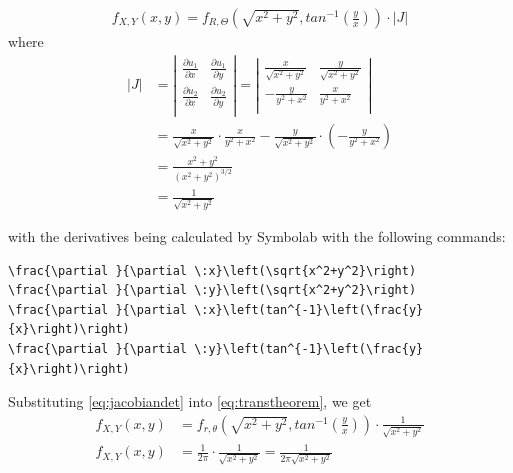 \begin{equation}
\begin{split}
f_{X,Y}(x,y) = f_{R,\Theta}\left(\sqrt{x^2+y^2},tan^{-1}\left(\frac{y}{x}\right)\right) \cdot |J|
\end{split}
\label{eq:transtheorem}
\end{equation}
where 
\begin{equation}
\begin{split}
|J| &=
\left|
\begin{matrix}
\frac{\partial u_1}{\partial x} & 
\frac{\partial u_1}{\partial y}  \\[2ex] %
\frac{\partial u_2}{\partial x} & 
\frac{\partial u_2}{\partial y}  \\[2ex]
\end{matrix}
\right|
= 
\left|
\begin{matrix}
\frac{x}{\sqrt{x^2+y^2}}& 
\frac{y}{\sqrt{x^2+y^2}}  \\[2ex] %
-\frac{y}{y^2+x^2} & 
\frac{x}{y^2+x^2}  \\[2ex]
\end{matrix}
\right|\\[2ex]
&= \frac{x}{\sqrt{x^2+y^2}} \cdot \frac{x}{y^2+x^2} -\frac{y}{\sqrt{x^2+y^2}}  \cdot \left(-\frac{y}{y^2+x^2}\right)\\[2ex]
&= \frac{x^2+y^2}{(x^2+y^2)^{3/2}}\\[2ex]
&=\frac{1}{\sqrt{x^2+y^2}}
\end{split}
\label{eq:jacobiandet}
\end{equation}

with the derivatives being calculated by Symbolab \cite{symbolab} with the following commands:
\begin{lstlisting}
\frac{\partial }{\partial \:x}\left(\sqrt{x^2+y^2}\right)
\frac{\partial }{\partial \:y}\left(\sqrt{x^2+y^2}\right)
\frac{\partial }{\partial \:x}\left(tan^{-1}\left(\frac{y}{x}\right)\right)
\frac{\partial }{\partial \:y}\left(tan^{-1}\left(\frac{y}{x}\right)\right)
\end{lstlisting}

Substituting \eqref{eq:jacobiandet} into \eqref{eq:transtheorem}, we get
\begin{equation}
\begin{split}
f_{X,Y}(x,y) &= f_{r,\theta}\left(\sqrt{x^2+y^2},tan^{-1}\left(\frac{y}{x}\right)\right) \cdot \frac{1}{\sqrt{x^2+y^2}}\\[2ex]
f_{X,Y}(x,y) &= \frac{1}{2\pi} \cdot \frac{1}{\sqrt{x^2+y^2}} = \frac{1}{2\pi\sqrt{x^2+y^2}}
\end{split}
\label{eq:transtheoremcomplete}
\end{equation}

